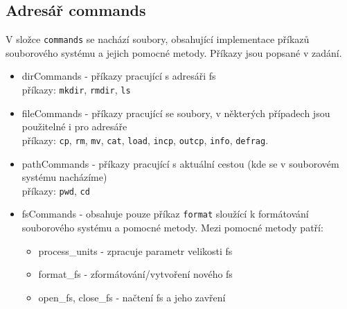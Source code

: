 \documentclass[12pt]{report}
\begin{document}
	\subsection*{Adresář commands}
	\par V složce \texttt{commands} se nachází soubory, obsahující implementace příkazů souborového systému a jejich pomocné metody. Příkazy jsou popsané v zadání.
	\begin{itemize}
		\item dirCommands - příkazy pracující s adresáři fs\\
		příkazy: \texttt{mkdir}, \texttt{rmdir}, \texttt{ls}
		\item fileCommands - příkazy pracující se soubory, v některých případech jsou použitelné i pro adresáře\\
		příkazy: \texttt{cp}, \texttt{rm}, \texttt{mv}, \texttt{cat}, \texttt{load}, \texttt{incp}, \texttt{outcp},
		\texttt{info}, \texttt{defrag}.
		\item pathCommands - příkazy pracující s aktuální cestou (kde se v souborovém systému nacházíme)\\
		příkazy: \texttt{pwd}, \texttt{cd}
		\item fsCommands - obsahuje pouze příkaz \texttt{format} sloužící k formátování souborového systému a pomocné metody. Mezi pomocné metody patří:
		\begin{itemize}
			\item process\_units - zpracuje parametr velikosti fs
			\item format\_fs - zformátování/vytvoření nového fs
			\item open\_fs, close\_fs - načtení fs a jeho zavření
		\end{itemize}
	\end{itemize}
\end{document}
